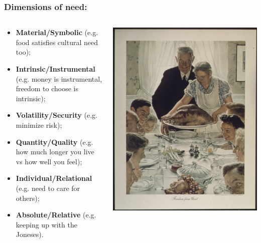 \documentclass[aspectratio=169]{beamer}
\theoremstyle{principle}
\begin{document}
\begin{frame}
\frametitle{Dimensions of need:}
\begin{columns}
\begin{column}{0.5\textwidth}

\begin{itemize}
\item \textbf{Material/Symbolic} (e.g. food satisfies cultural need too);
\item \textbf{Intrinsic/Instrumental} (e.g. money is instrumental, freedom to choose is intrinsic);
\item \textbf{Volatility/Security} (e.g. minimize risk);
\item \textbf{Quantity/Quality} (e.g. how much longer you live vs how well you feel);
\item \textbf{Individual/Relational} (e.g. need to care for others);
\item \textbf{Absolute/Relative} (e.g. keeping up with the Joneses).
\end{itemize}
\end{column}
\begin{column}{0.5\textwidth}
\includegraphics[scale=0.25]{Freedom_From_Want.jpg}
\end{column}
\end{columns}
\end{frame}
\end{document}
